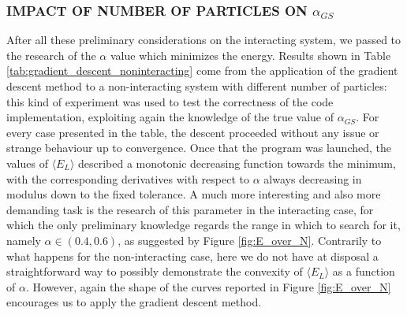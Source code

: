 \subsubsection*{IMPACT OF NUMBER OF PARTICLES ON $\alpha_{GS}$}
After all these preliminary considerations on the interacting system, we passed to the research of the $\alpha$ value which minimizes the energy. Results shown in Table \ref{tab:gradient_descent_noninteracting} come from the application of the gradient descent method to a non-interacting system with different number of particles: this kind of experiment was used to test the correctness of the code implementation, exploiting again the knowledge of the true value of $\alpha_{GS}$. For every case presented in the table, the descent proceeded without any issue or strange behaviour up to convergence. Once that the program was launched, the values of $\langle E_L \rangle$ described a monotonic decreasing function towards the minimum, with the corresponding derivatives with respect to $\alpha$ always decreasing in modulus down to the fixed tolerance. A much more interesting and also more demanding task is the research of this parameter in the interacting case, for which the only preliminary knowledge regards the range in which to search for it, namely $\alpha\in(0.4, 0.6)$, as suggested by Figure \ref{fig:E_over_N}. Contrarily to what happens for the non-interacting case, here we do not have at disposal a straightforward way to possibly demonstrate the convexity of $\langle E_L \rangle$ as a function of $\alpha$. However, again the shape of the curves reported in Figure \ref{fig:E_over_N} encourages us to apply the gradient descent method. 

